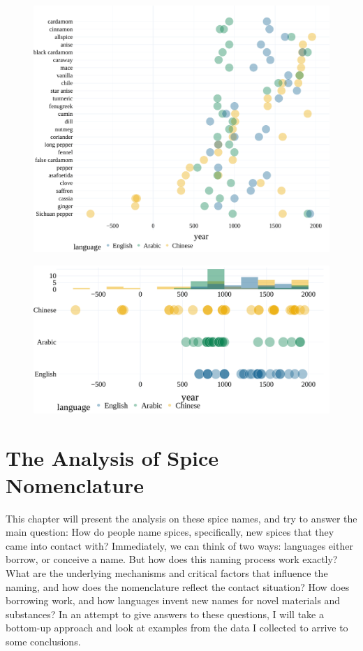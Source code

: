 \begin{figure}[!ht]
  \centering
  \includegraphics[width=\linewidth]{imgs/plots/attestation.pdf}
  \caption{}
  \label{fig:attestation}
\end{figure}

\begin{figure}[!ht]
  \centering
  \includegraphics[width=\linewidth]{imgs/plots/attestation_compact.pdf}
  \caption{}
  \label{fig:attestation_compact}
\end{figure}

\section{The Analysis of Spice Nomenclature}

This chapter will present the analysis on these spice names, and try to answer the main question: How do people name spices, specifically, new spices that they came into contact with? Immediately, we can think of two ways: languages either borrow, or conceive a name. But how does this naming process work exactly? What are the underlying mechanisms and critical factors that influence the naming, and how does the nomenclature reflect the contact situation? How does borrowing work, and how languages invent new names for novel materials and substances? In an attempt to give answers to these questions, I will take a bottom-up approach and look at examples from the data I collected to arrive to some conclusions.

